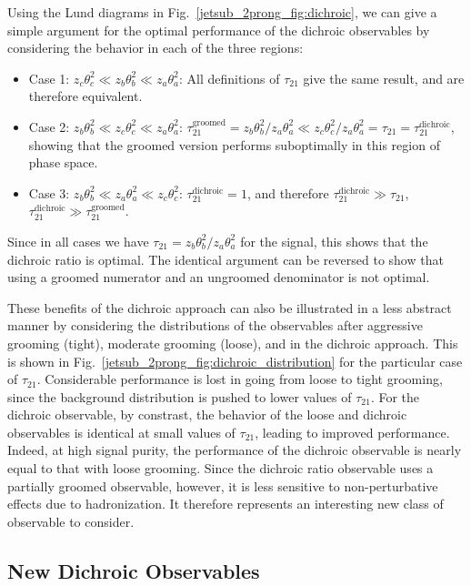 \documentclass[11pt,letterpaper]{article}
\begin{document}
Using the Lund diagrams \cite{Andersson:1988gp} in Fig.~\ref{jetsub_2prong_fig:dichroic}, we can give a simple argument for the optimal performance of the dichroic observables by considering the behavior in each of the three regions:
\begin{itemize}
\item Case 1: $z_c \theta_c^2 \ll z_b \theta_b^2 \ll z_a \theta_a^2$: All definitions of $\tau_{21}$ give the same result, and are therefore equivalent.
\item Case 2: $z_b\theta_b^2 \ll z_c \theta_c^2 \ll z_a \theta_a^2$: $\tau_{21}^\text{groomed}=z_b \theta_b^2/z_a \theta_a^2 \ll  z_c \theta_c^2/z_a \theta_a^2=\tau_{21}=\tau_{21}^\text{dichroic}$, showing that the groomed version performs suboptimally in this region of phase space.
\item Case 3: $z_b \theta_b^2 \ll z_a \theta_a^2 \ll z_c \theta_c^2$: $\tau_{21}^\text{dichroic}=1$, and therefore $\tau_{21}^\text{dichroic} \gg \tau_{21}$, $\tau_{21}^\text{dichroic} \gg \tau_{21}^\text{groomed}$. 
\end{itemize}
Since in all cases we have $\tau_{21}=z_b\theta_b^2/z_a\theta_a^2$ for
the signal, this shows that the dichroic
ratio is optimal.
%
The identical argument can be reversed to show that
using a groomed numerator and an ungroomed denominator is not optimal.

These benefits of the dichroic approach can also be illustrated in a less abstract manner by considering the distributions of the observables after aggressive grooming (tight), moderate grooming (loose), and in the dichroic approach.
%
This is shown in Fig.~\ref{jetsub_2prong_fig:dichroic_distribution} for the particular case of $\tau_{21}$.
%
Considerable performance is lost in going from loose to tight grooming, since the background distribution is pushed to lower values of $\tau_{21}$.
%
For the dichroic observable, by constrast, the behavior of the loose and dichroic observables is identical at small values of $\tau_{21}$, leading to improved performance.
%
Indeed, at high signal purity, the performance of the dichroic observable is nearly equal to that with loose grooming.
%
Since the dichroic ratio observable uses a partially groomed observable, however, it is less sensitive to non-perturbative effects due to hadronization.
%
It therefore represents an interesting new class of observable to consider. 

\subsection{New Dichroic Observables}\label{jetsub_2prong_sec:dichroic_new}
\end{document}
